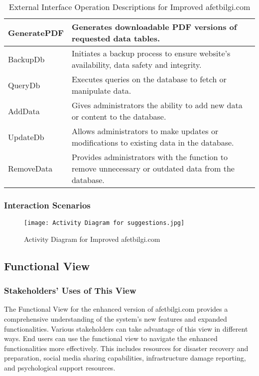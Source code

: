 \documentclass[12pt, letterpaper]{article}
\begin{document}
\begin{table}[H]
\begin{tabular}{|l|p{10cm}|}
        \hline
        GeneratePDF & Generates downloadable PDF versions of requested data tables. \\
        \hline
        BackupDb & Initiates a backup process to ensure website's availability, data safety and integrity. \\
        \hline
        QueryDb & Executes queries on the database to fetch or manipulate data. \\
        \hline
        AddData & Gives administrators the ability to add new data or content to the database. \\
        \hline
        UpdateDb & Allows administrators to make updates or modifications to existing data in the database. \\
        \hline 
        RemoveData & Provides administrators with the function to remove unnecessary or outdated data from the database. \\
        \hline
    \end{tabular}
    \caption{External Interface Operation Descriptions for Improved afetbilgi.com}
    \label{tab:operations}
\end{table} 

\newpage

\subsubsection{Interaction Scenarios}

\begin{figure}[H]
\centering
\texttt{[image: Activity Diagram for suggestions.jpg]}
\caption{Activity Diagram for Improved afetbilgi.com}
\end{figure}
\newpage

\subsection{Functional View}
\subsubsection{Stakeholders' Uses of This View}
The Functional View for the enhanced version of afetbilgi.com provides a comprehensive understanding of the system's new features and expanded functionalities. Various stakeholders can take advantage of this view in different ways. End users can use the functional view to navigate the enhanced functionalities more effectively. This includes resources for disaster recovery and preparation, social media sharing capabilities, infrastructure damage reporting, and psychological support resources.
\end{document}
